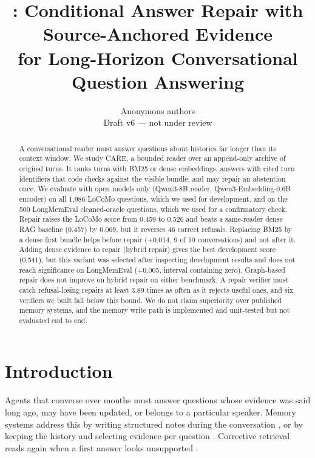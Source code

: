 \documentclass[10pt]{article}
\title{\textbf{\care{}: Conditional Answer Repair with Source-Anchored Evidence\\
for Long-Horizon Conversational Question Answering}}
\author{Anonymous authors\\ \small Draft v6 --- not under review}
\date{}
\theoremstyle{plain}
\newcommand{\care}{\textsc{CARE}}
\begin{document}
\maketitle

\begin{abstract}
A conversational reader must answer questions about histories far longer than its context window. We
study \care{}, a bounded reader over an append-only archive of original turns. It ranks turns with BM25
or dense embeddings, answers with cited turn identifiers that code checks against the visible bundle,
and may repair an abstention once. We evaluate with open models only (Qwen3-8B reader,
Qwen3-Embedding-0.6B encoder) on all 1,986 LoCoMo questions, which we used for development, and on the
500 LongMemEval cleaned-oracle questions, which we used for a confirmatory check. Repair raises the
LoCoMo score from 0.459 to 0.526 and beats a same-reader dense RAG baseline (0.457) by 0.069, but it
reverses 46 correct refusals. Replacing BM25 by a dense first bundle helps before repair
(+0.014, 9 of 10 conversations) and not after it. Adding dense evidence to repair (hybrid repair) gives
the best development score (0.541), but this variant was selected after inspecting development results
and does not reach significance on LongMemEval (+0.005, interval containing zero). Graph-based repair
does not improve on hybrid repair on either benchmark. A repair verifier must catch refusal-losing repairs
at least 3.89 times as often as it rejects useful ones, and six verifiers we built fall below this bound.
We do not claim superiority over published memory systems, and the memory write path is implemented and
unit-tested but not evaluated end to end.
\end{abstract}

\section{Introduction}
\label{sec:intro}

Agents that converse over months must answer questions whose evidence was said long ago, may have
been updated, or belongs to a particular speaker. Memory systems address this by writing structured notes
during the conversation \citep{packer2023memgpt,chhikara2025mem0,amem2025,memoryr12025,cao2026higmem}, or by
keeping the history and selecting evidence per question \citep{du2026memr3,wang2026cuemem,liu2026livectx,chen2026justmem,yu2026lazymem}.
Corrective retrieval reads again when a first answer looks unsupported \citep{jiang2023active,asai2023selfrag,yan2024crag}.
\end{document}
